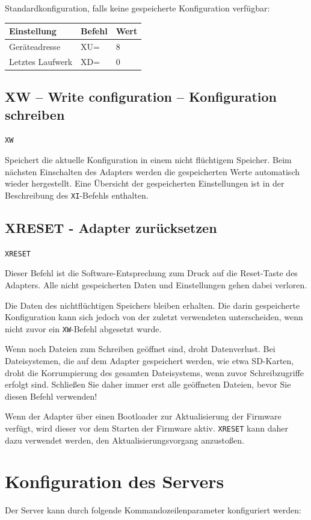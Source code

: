 \documentclass[10pt,a4paper]{scrartcl}		%
\begin{document}
Standardkonfiguration, falls keine gespeicherte Konfiguration verfügbar:

\begin{tabular}[c]{l l l}
\toprule 
Einstellung & Befehl & Wert\\
\midrule
Geräteadresse		& XU= & 8 \\
Letztes Laufwerk	& XD= & 0 \\
\bottomrule
\end{tabular}

\clearpage %
\subsection{XW -- Write configuration -- Konfiguration schreiben}

\texttt{XW}

Speichert die aktuelle Konfiguration in einem nicht flüchtigem Speicher.
Beim nächsten Einschalten des Adapters werden die gespeicherten Werte
automatisch wieder hergestellt. Eine Übersicht der gespeicherten
Einstellungen ist in der Be\-schrei\-bung des \texttt{XI}-Befehls enthalten.

\subsection{XRESET - Adapter zurücksetzen}

\texttt{XRESET}

Dieser Befehl ist die Software-Entsprechung zum Druck auf die Reset-Taste
des Adapters. Alle nicht gespeicherten Daten und Einstellungen gehen dabei
verloren.

Die Daten des nichtflüchtigen Speichers bleiben erhalten. Die darin
gespeicherte Konfiguration kann sich jedoch von der zuletzt verwendeten
unterscheiden, wenn nicht zuvor ein \texttt{XW}-Befehl abgesetzt
wurde. 

Wenn noch Dateien zum Schreiben geöffnet sind, droht Datenverlust. 
Bei Dateisystemen, die auf dem Adapter gespeichert werden, wie etwa SD-Karten,
droht die Korrumpierung des gesamten Dateisystems, wenn zuvor
Schreibzugriffe erfolgt sind. Schließen Sie daher immer erst alle
geöffneten Dateien, bevor Sie diesen Befehl verwenden!

Wenn der Adapter über einen Bootloader zur Aktualisierung der Firmware
verfügt, wird dieser vor dem Starten der Firmware aktiv. \texttt{XRESET}
kann daher dazu verwendet werden, den Aktualisierungsvorgang anzustoßen.

\clearpage
\section{Konfiguration des Servers}
Der Server kann durch folgende Kommandozeilenparameter konfiguriert 
werden:
\end{document}
